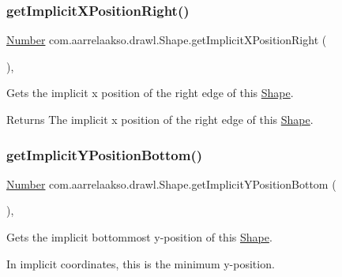 \subsubsection{\texorpdfstring{get\+Implicit\+X\+Position\+Right()}{getImplicitXPositionRight()}}
{\footnotesize\ttfamily \hyperlink{interfacecom_1_1aarrelaakso_1_1drawl_1_1_number}{Number} com.\+aarrelaakso.\+drawl.\+Shape.\+get\+Implicit\+X\+Position\+Right (\begin{DoxyParamCaption}{ }\end{DoxyParamCaption})\hspace{0.3cm}{\ttfamily [protected]}, {\ttfamily [inherited]}}



Gets the implicit x position of the right edge of this \hyperlink{classcom_1_1aarrelaakso_1_1drawl_1_1_shape}{Shape}. 

\begin{DoxyReturn}{Returns}
The implicit x position of the right edge of this \hyperlink{classcom_1_1aarrelaakso_1_1drawl_1_1_shape}{Shape}. 
\end{DoxyReturn}
\mbox{\label{classcom_1_1aarrelaakso_1_1drawl_1_1_shape_a8d44b02976656bf4a81055a2dbae66cb}} 
\subsubsection{\texorpdfstring{get\+Implicit\+Y\+Position\+Bottom()}{getImplicitYPositionBottom()}}
{\footnotesize\ttfamily \hyperlink{interfacecom_1_1aarrelaakso_1_1drawl_1_1_number}{Number} com.\+aarrelaakso.\+drawl.\+Shape.\+get\+Implicit\+Y\+Position\+Bottom (\begin{DoxyParamCaption}{ }\end{DoxyParamCaption})\hspace{0.3cm}{\ttfamily [protected]}, {\ttfamily [inherited]}}



Gets the implicit bottommost y-\/position of this \hyperlink{classcom_1_1aarrelaakso_1_1drawl_1_1_shape}{Shape}. 

In implicit coordinates, this is the minimum y-\/position.

